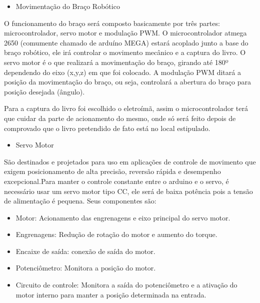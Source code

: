 \begin{itemize}
\item{Movimentação do Braço Robótico}
\end{itemize}

O funcionamento do braço será composto basicamente por três partes: microcontrolador, servo motor e modulação PWM. O microcontrolador atmega 2650 (comumente chamado de arduíno MEGA)  estará acoplado junto a base do braço robótico, ele irá controlar o movimento mecânico e a captura do livro. O servo motor é o que realizará a movimentação do braço, girando até 180º dependendo do eixo (x,y,z) em que foi colocado. A modulação PWM ditará a posição da movimentação do braço, ou seja, controlará a abertura do braço para posição desejada (ângulo).

Para a captura do livro foi escolhido o eletroímã, assim o microcontrolador terá que cuidar da parte de acionamento do mesmo, onde só será feito depois de comprovado que o livro pretendido de fato está no local estipulado.

\begin{itemize}
\item{Servo Motor}
\end{itemize}

São destinados e projetados para uso em aplicações de controle de movimento que exigem posicionamento de alta precisão, reversão rápida e desempenho excepcional.Para manter o controle constante entre o arduino e o servo, é necessário usar um servo motor tipo CC, ele será de baixa potência pois a tensão de alimentação é pequena. Seus componentes são:

\begin{itemize}
\item Motor: Acionamento das engrenagens e eixo principal do servo motor.
\item Engrenagens: Redução de rotação do motor e aumento do torque.
\item Encaixe de saída: conexão de saída do motor.
\item Potenciômetro: Monitora a posição do motor.
\item Circuito de controle: Monitora a saída do potenciômetro e a ativação do motor interno para manter a posição determinada na entrada.
\end{itemize}

